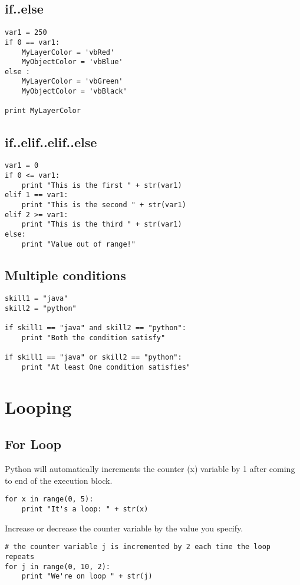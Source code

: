 \documentclass[a4paper,9pt]{extarticle}
\begin{document}
\begin{multicols*}{2}
\subsection{if..else}
\begin{lstlisting}
var1 = 250
if 0 == var1:
    MyLayerColor = 'vbRed'
    MyObjectColor = 'vbBlue'
else :
    MyLayerColor = 'vbGreen'
    MyObjectColor = 'vbBlack'

print MyLayerColor
\end{lstlisting}

\subsection{if..elif..elif..else}
\begin{lstlisting}
var1 = 0
if 0 <= var1:
    print "This is the first " + str(var1)
elif 1 == var1:
    print "This is the second " + str(var1)
elif 2 >= var1:
    print "This is the third " + str(var1)
else:
    print "Value out of range!"
\end{lstlisting}

\subsection{Multiple conditions}
\begin{lstlisting}
skill1 = "java"
skill2 = "python"

if skill1 == "java" and skill2 == "python":
    print "Both the condition satisfy"

if skill1 == "java" or skill2 == "python":
    print "At least One condition satisfies"

\end{lstlisting}


\section{Looping}

\subsection{For Loop}
Python will automatically increments the counter (x) variable by 1 after coming to end of the execution block.
\begin{lstlisting}
for x in range(0, 5):
    print "It's a loop: " + str(x)
\end{lstlisting}

Increase or decrease the counter variable by the value you specify.
\begin{lstlisting}
# the counter variable j is incremented by 2 each time the loop repeats
for j in range(0, 10, 2):
    print "We're on loop " + str(j)


\end{lstlisting}
\end{multicols*}
\end{document}
